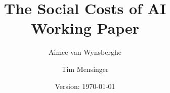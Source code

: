 \usepackage[T1]{fontenc}
\usepackage[utf8]{inputenc}
\usepackage[left=1in, right=1in, top=1in, bottom=1in]{geometry}
\usepackage[affil-it]{authblk}

\usepackage{amsmath}
\usepackage{amssymb}
\usepackage{hyperref}
\usepackage{mathpazo}
\usepackage{tgpagella}
\usepackage{xcolor}

\linespread{1.25}

\usepackage[backend=biber, style=ieee, autocite=inline, doi=false, url=true]{biblatex}
\setcounter{biburlnumpenalty}{85}  %

\renewcommand*{\bibfont}{\footnotesize}

\newcommand{\mycite}[1]{\citeauthor*{#1} (\citeyear{#1}, \cite{#1})}



\newcommand{\blue}[1]{\textcolor{bonnblue}{#1}}
\newcommand{\yellow}[1]{\textcolor{bonnyellow}{#1}}
\newcommand{\grey}[1]{\textcolor{bonngrey}{#1}}
\newcommand{\red}[1]{\textcolor{bonnred}{#1}}

\renewcommand\thefootnote{\blue{\arabic{footnote}}}

\hypersetup{
    colorlinks=true,
    urlcolor=bonnblue,
    citecolor=bonnblue,
    allcolors=bonnblue,
}


\newcommand\blfootnote[1]{%
  \begingroup
  \renewcommand\thefootnote{}\footnote{#1}%
  \addtocounter{footnote}{-1}%
  \endgroup
}


\title{\textbf{The Social Costs of AI}\\
    \Large \red{Working Paper}
}
\date{Version: \today}
\author[1]{Aimee van Wynsberghe}
\author[2]{Tim Mensinger}

